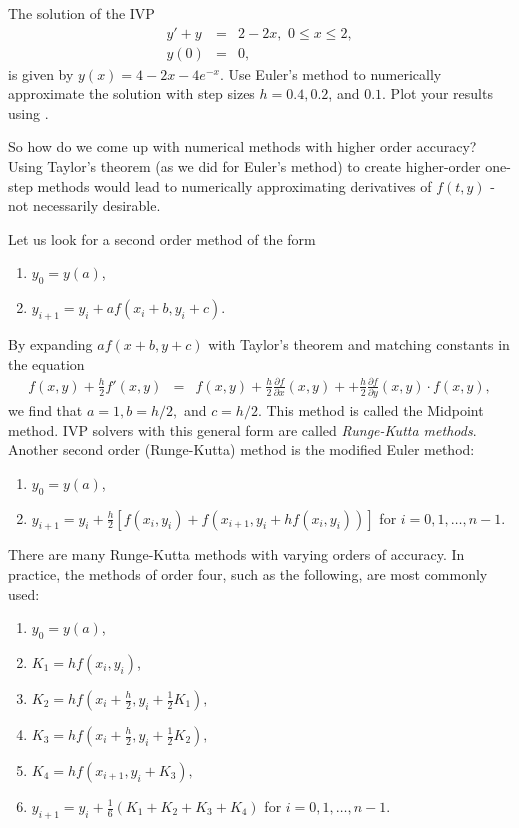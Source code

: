 \begin{problem}
The solution of the IVP
\begin{eqnarray*}
y' + y &=& 2-2x,\,\, 0 \leq x \leq 2, \\
y(0) &=& 0,
\end{eqnarray*}
is given by $y(x) = 4-2x -4e^{-x}$. Use Euler's method to numerically approximate the solution
with step sizes $h = 0.4, 0.2$, and $0.1.$ Plot your results using .
\end{problem}



So how do we come up with numerical methods with higher order accuracy? Using Taylor's theorem (as we did for Euler's method) to create higher-order one-step methods would lead to numerically approximating derivatives of $f(t,y)$ - not necessarily desirable. 

Let us look for a second order method of the form 
\begin{enumerate}
\item $y_0 = y(a)$,
\item $y_{i+1} = y_i + a f(x_i+b, y_i+c)$.
\end{enumerate}
By expanding $a f(x+b, y+c)$ with Taylor's theorem and matching constants in the equation
\begin{eqnarray*}
f(x,y) + \frac{h}{2}f'(x,y) &=& f(x,y) + \frac{h}{2}\frac{\partial f}{\partial x}(x,y) +  + \frac{h}{2}\frac{\partial f}{\partial y}(x,y) \cdot f(x,y),
\end{eqnarray*}
we find that $a = 1, b = h/2,$ and $c = h/2$. This method is called the Midpoint method. IVP solvers with this general form are called \textit{Runge-Kutta methods}. Another second order (Runge-Kutta) method is the modified Euler method: 
\begin{enumerate}
\item $y_0 = y(a)$,
\item $y_{i+1} = y_i + \frac{h}{2}[ f(x_i, y_i) + f(x_{i+1}, y_i+ hf(x_i, y_i))]$ for $i = 0,1,\hdots, n-1$. 
\end{enumerate}

There are many Runge-Kutta methods with varying orders of accuracy. In practice, the methods of order four, such as the following, are most commonly used: 
\begin{enumerate}
\item $y_0 = y(a)$, 
\item $K_1 = hf(x_i,y_i)$,
\item $K_2 = hf(x_i + \frac{h}{2}, y_i + \frac{1}{2} K_1),$
\item $K_3 = hf(x_i + \frac{h}{2} , y_i + \frac{1}{2} K_2),$
\item $K_4 = hf(x_{i+1} , y_i +  K_3),$
\item $y_{i+1} = y_i + \frac{1}{6}(K_1 + K_2 + K_3 + K_4)$ for $i = 0,1,\hdots,n-1$.
\end{enumerate}




